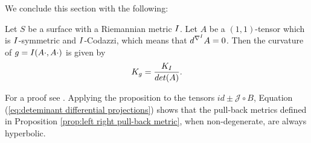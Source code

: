 We conclude this section with the following:

\begin{proposition} \label{prop:Gaussian curvature}
    Let $S$ be a surface with a Riemannian metric $I$. Let $A$ be a $(1,1)$-tensor which is $I$-symmetric and $I$-Codazzi, which means that $d^{\nabla^{I}} A=0$. Then the curvature of $g= I(A \cdot, A \cdot)$ is given by
    \[
        K_g = \frac{K_I}{det(A)}.
    \]
\end{proposition}
For a proof see \cite{Krasnov_2007}. Applying the proposition to the tensors $id \pm \mathcal{J} \circ B$, Equation (\ref{eq:deteminant differential projections}) shows that the pull-back metrics defined in Proposition \ref{prop:left right pull-back metric}, when non-degenerate, are always hyperbolic.
